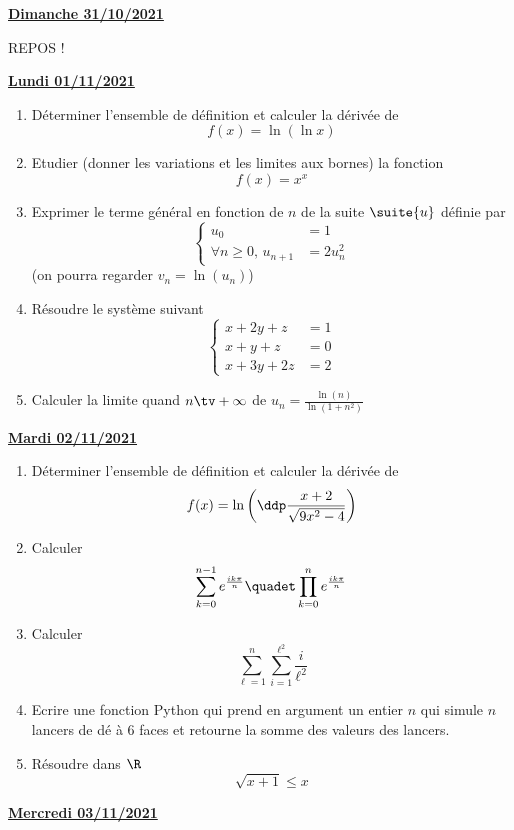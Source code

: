 \documentclass[a4paper, 11pt,reqno]{article}
\newcommand{\jour}[1]{
\begin{center}
\underline{\textbf{#1}}
\end{center}

 }
\begin{document}
\jour{Dimanche 31/10/2021}
REPOS ! 

\jour{Lundi 01/11/2021}
\begin{exercice}
\begin{enumerate}
\item  Déterminer l'ensemble de définition et calculer la dérivée de
$$f(x)=\ln{(\ln{x})}$$
\item  Etudier (donner les variations et les limites aux bornes)  la fonction $$f(x) =x^x$$
\item Exprimer le terme général en fonction de $n$ de la suite $\suite{u}$ définie par 
$$\left\{\begin{array}{rl}
u_0 &=1\\
\forall n\geq 0,\,  u_{n+1}&=2u_n^2
\end{array}\right.$$
(on pourra regarder $v_n=\ln(u_n)$)
\item Résoudre le système suivant $$\left\{ 
\begin{array}{cc}
x+2y+z&=1\\
x+y+z&=0\\
x+3y+2z&=2
\end{array}
\right.$$
\item Calculer la limite quand $n\tv+\infty$ de $u_n=\frac{\ln(n)}{\ln(1+n^2)}$
\end{enumerate}
\end{exercice}




\jour{Mardi 02/11/2021}
\begin{exercice}
\begin{enumerate}
\item  Déterminer l'ensemble de définition et calculer la dérivée de
$$f(x)=\ln{\left(  \ddp\frac{x+2}{\sqrt{9x^2-4}} \right)}$$

\item  Calculer $$\sum_{k=0}^{n-1} e^{\frac{ik\pi}{n} }\quadet \prod_{k=0}^{n} e^{\frac{ik\pi}{n} }$$
\item  Calculer 
$$\sum_{\ell=1}^{n} \sum_{i=1}^{\ell^2}\frac{i}{\ell^2}$$
\item Ecrire une fonction Python qui prend en argument un entier $n$ qui simule $n$ lancers de dé à 6 faces et retourne la somme des valeurs des lancers. 
\item Résoudre dans $\R$
$$\sqrt{x+1}\leq x$$
\end{enumerate}
\end{exercice}

\jour{Mercredi 03/11/2021}
\end{document}
